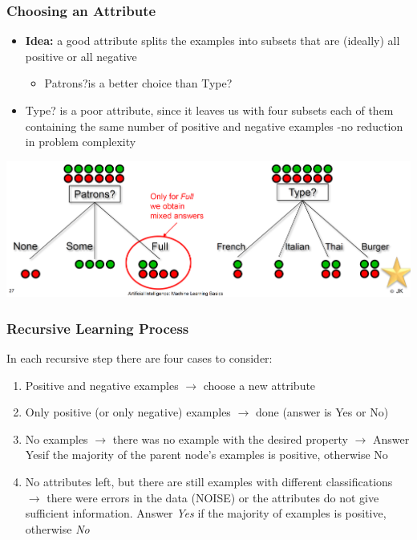 \documentclass[conference]{styles/acmsiggraph}
\begin{document}
        \subsubsection{Choosing an Attribute}
            \begin{itemize}
                \item \textbf{Idea:} a good attribute splits the examples into subsets that are (ideally) all positive or all negative
                \begin{itemize}
                    \item Patrons?is a better choice than Type?
                \end{itemize}
                \item Type? is a poor attribute, since it leaves us with four subsets each of them containing the same number of positive and negative examples -no reduction in problem complexity
            \end{itemize}
            \includegraphics[width=1\textwidth]{imgs/ChoosingAnAttribute.png}\newline

\newpage

        \subsubsection{Recursive Learning Process}
            In each recursive step there are four cases to consider:
            \begin{enumerate}
                \item Positive and negative examples\newline
                $\rightarrow$ choose a new attribute
                \item Only positive (or only negative) examples\newline
                $\rightarrow$ done (answer is Yes or No)
                \item No examples\newline
                $\rightarrow$ there was no example with the desired property\newline 
                $\rightarrow$ Answer Yesif the majority of the parent node's examples is positive, otherwise No
                \item No attributes left, but there are still examples with different classifications\newline
                $\rightarrow$ there were errors in the data (NOISE) or the attributes do not give sufficient information. Answer \textit{Yes} if the majority of examples is positive, otherwise \textit{No}
            \end{enumerate}
        
\end{document}
